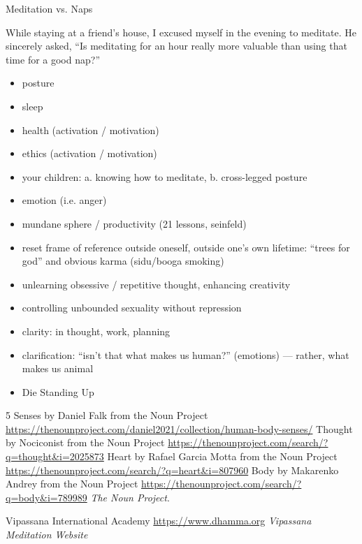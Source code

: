\documentclass{article}
\begin{document}
\begin{center}
  \Huge{Meditation vs. Naps}
\end{center}

While staying at a friend's house, I excused myself in the evening to meditate. He
sincerely asked, ``Is meditating for an hour really more valuable than using that
time for a good nap?''

\begin{itemize}
  \item posture
  \item sleep
  \item health (activation / motivation)
  \item ethics (activation / motivation)
  \item your children: a. knowing how to meditate, b. cross-legged posture
  \item emotion (i.e. anger)
  \item mundane sphere / productivity (21 lessons, seinfeld)
  \item reset frame of reference outside oneself, outside one's own lifetime: ``trees for god'' and obvious karma (sidu/booga smoking)
  \item unlearning obsessive / repetitive thought, enhancing creativity
  \item controlling unbounded sexuality without repression
  \item clarity: in thought, work, planning
  \item clarification: ``isn't that what makes us human?'' (emotions) --- rather, what makes us animal
  \item Die Standing Up

\end{itemize}

\pagebreak

\begin{thebibliography}{9}
\raggedright

  5 Senses by Daniel Falk from the Noun Project
  \url{https://thenounproject.com/daniel2021/collection/human-body-senses/}
  Thought by Nociconist from the Noun Project
  \url{https://thenounproject.com/search/?q=thought&i=2025873}
  Heart by Rafael Garcia Motta from the Noun Project
  \url{https://thenounproject.com/search/?q=heart&i=807960}
  Body by Makarenko Andrey from the Noun Project
  \url{https://thenounproject.com/search/?q=body&i=789989}
  \textit{The Noun Project}.

  Vipassana International Academy
  \url{https://www.dhamma.org}
  \textit{Vipassana Meditation Website}


\end{thebibliography}
\end{document}
